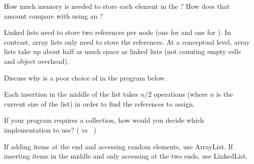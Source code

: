 \Q How much memory is needed to store each element in the ?
How does that amount compare with using an ?

\begin{answer}
Linked lists need to store two references per node (one for  and one for ).
In contrast, array lists only need to store the  references.
At a conceptual level, array lists take up about half as much space as linked lists (not counting empty cells and object overhead).
\end{answer}


\Q \label{LinksAreBad}
Discuss why  is a poor choice of  in the program below.

\begin{quote}
\end{quote}
\vspace{-1em}

\begin{answer}
Each insertion in the middle of the list takes $n/2$ operations (where $n$ is the current size of the list) in order to find the  references to assign.
\end{answer}


\Q \label{key3}
If your program requires a  collection, how would you decide which implementation to use? ( vs ~)

\begin{answer}
If adding items at the end and accessing random elements, use ArrayList.
If inserting items in the middle and only accessing at the two ends, use LinkedList.
\end{answer}

